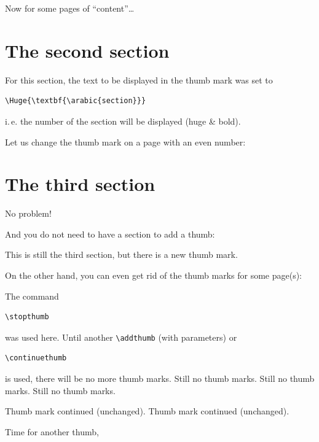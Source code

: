 \documentclass[a4paper,twoside,british]{article}[2025/01/22]%
\begin{document}
Now for some pages of \textquotedblleft content\textquotedblright\ldots

\newpage
\lipsum[1]
\newpage
\lipsum[1]
\newpage
\lipsum[1]
\newpage

\section{The second section}

For this section, the text to be displayed in the thumb mark was set to
\begin{verbatim}
\Huge{\textbf{\arabic{section}}}
\end{verbatim}
i.\,e. the number of the section will be displayed (huge \& bold).\newline

Let us change the thumb mark on a page with an even number:
\newpage

\section{The third section}

No problem!

And you do not need to have a section to add a thumb:
\newpage


This is still the third section, but there is a new thumb mark.

On the other hand, you can even get rid of the thumb marks for some page(s):
\newpage

\stopthumb

\noindent The command
\begin{verbatim}
\stopthumb
\end{verbatim}
was used here. Until another \verb|\addthumb| (with parameters) or
\begin{verbatim}
\continuethumb
\end{verbatim}
is used, there will be no more thumb marks.
\newpage
Still no thumb marks.\newpage
Still no thumb marks.\newpage
Still no thumb marks.\newpage

\continuethumb

Thumb mark continued (unchanged).\newpage
Thumb mark continued (unchanged).\newpage

Time for another thumb,
\end{document}

